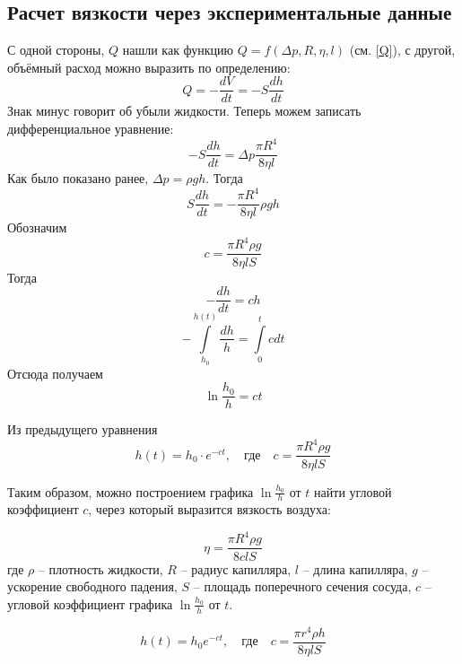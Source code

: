 \documentclass[a4paper,12pt]{article}%
\begin{document}
\newpage
\subsection{Расчет вязкости через экспериментальные данные}

С одной стороны, $Q$ нашли как функцию $Q=f(\Delta p, R, \eta, l)$ (см. \ref{Q}), с другой, объёмный расход можно выразить по определению:
\begin{equation}
	Q=-\frac{dV}{dt}=-S\frac{dh}{dt}
\end{equation}
Знак минус говорит об убыли жидкости.
Теперь можем записать дифференциальное уравнение:
\begin{equation}
	-S\frac{dh}{dt}=\Delta p \frac{\pi R^4}{8\eta l}
\end{equation}
Как было показано ранее, $\Delta p = \rho g h$. Тогда
\begin{equation}
 	S\frac{dh}{dt}=-\frac{\pi R^4}{8\eta l}\rho g h
 \end{equation} 
Обозначим 
\begin{equation}
	c=\frac{\pi R^4 \rho g}{8\eta lS}
\end{equation}
Тогда
\begin{equation}
	-\frac{dh}{dt}=ch
\end{equation}
\begin{equation}
	-\int\limits_{h_0}^{h(t)}\frac{dh}{h}=\int\limits_0^tcdt
\end{equation}
Отсюда получаем
\begin{equation}
	\ln\frac{h_0}h=ct
\end{equation}

Из предыдущего уравнения
\begin{equation}
	h(t)=h_0\cdot e^{-ct},\quad\text{где}\quad
	c=\frac{\pi R^4 \rho g}{8\eta lS}
\end{equation}

Таким образом, можно построением графика $\ln\frac{h_0}h$ от $t$ найти угловой коэффициент $c$, через который выразится вязкость воздуха:

\begin{equation}
	\eta=\frac{\pi R^4 \rho g}{8clS}
\end{equation}
где $\rho$ -- плотность жидкости, $R$ -- радиус капилляра, $l$ -- длина капилляра, $g$ -- ускорение свободного падения, $S$ -- площадь поперечного сечения сосуда, $c$ -- угловой коэффициент графика $\ln\frac{h_0}h$ от $t$.


\begin{equation}
	\label{ht}
	h(t)=h_0e^{-ct},\quad\text{где}\quad c=\frac{\pi r^4 \rho h}{8\eta lS}
\end{equation}
\end{document}
